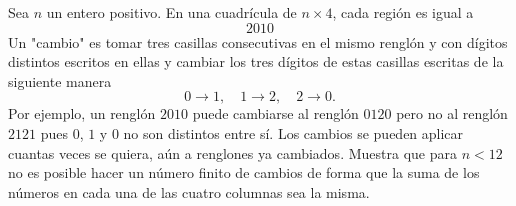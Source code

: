 Sea $n$ un entero positivo. En una cuadrícula de $n\times 4$, cada región es igual a 
\[\boxed{2}\boxed{0}\boxed{1}\boxed{0}\]
Un "cambio" es tomar tres casillas consecutivas en el mismo renglón y con dígitos distintos escritos en ellas y cambiar los tres dígitos de estas casillas escritas de la siguiente manera
\[0\to 1, \quad 1\to 2, \quad 2\to 0.\]
Por ejemplo, un renglón $\boxed{2}\boxed{0}\boxed{1}\boxed{0}$ puede cambiarse al renglón $\boxed{0}\boxed{1}\boxed{2}\boxed{0}$ pero no al renglón $\boxed{2}\boxed{1}\boxed{2}\boxed{1}$ pues $0$, $1$ y $0$ no son distintos entre sí.
Los cambios se pueden aplicar cuantas veces se quiera, aún a renglones ya cambiados.
Muestra que para $n < 12$ no es posible hacer un número finito de cambios de forma que
la suma de los números en cada una de las cuatro columnas sea la misma.